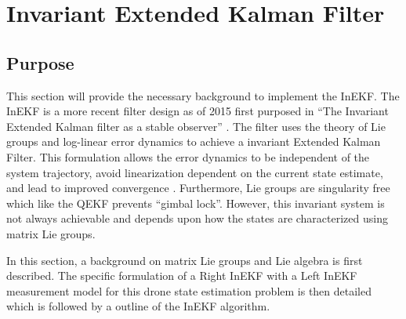 \section{Invariant Extended Kalman Filter}
\subsection{Purpose}
This section will provide the necessary background to implement the InEKF. The InEKF is a more recent filter design as of 2015 first purposed in ``The Invariant Extended Kalman filter as a stable observer'' \cite{DBLP:journals/corr/BarrauB14}. The filter uses the theory of Lie groups and log-linear error dynamics to achieve a invariant Extended Kalman Filter. This formulation allows the error dynamics to be independent of the system trajectory, avoid linearization dependent on the current state estimate, and lead to improved convergence \cite{Contact-Aided_Invarant_EKF}. Furthermore, Lie groups are singularity free which like the QEKF prevents ``gimbal lock''. However, this invariant system is not always achievable and depends upon how the states are characterized using matrix Lie groups.

In this section, a background on matrix Lie groups and Lie algebra is first described. The specific formulation of a Right InEKF with a Left InEKF measurement model for this drone state estimation problem is then detailed which is followed by a outline of the InEKF algorithm.


